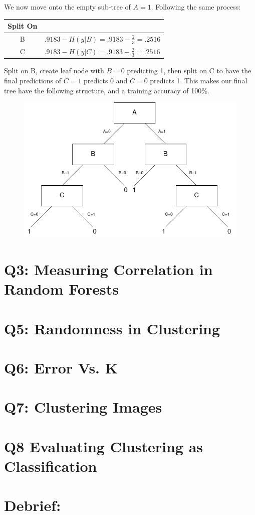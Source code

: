 \documentclass{article}
\begin{document}
        \qquad We now move onto the empty sub-tree of $A=1$. 
        Following the same process:
        \begin{center}
            \begin{tabular}{c | l}
                Split On & \\
                \hline
                B & $.9183 - H(y | B) = .9183 - \frac{2}{3} = .2516$\\
                C & $.9183 - H(y | C) = .9183 - \frac{2}{3} = .2516$\\
            \end{tabular}
        \end{center}
        \qquad Split on B, create leaf node with $B=0$ predicting 1, then split on C to have the final predictions of $C=1$ predicts 0 and $C=0$ predicts 1. 
        This makes our final tree have the following structure, and a training accuracy of 100\%. 
        \begin{figure}[h]
            \centering
            \includegraphics[width=.5\textwidth]{"Q2_2.png"}
        \end{figure}
        \clearpage


    \section*{Q3: Measuring Correlation in Random Forests}
    \section*{Q5: Randomness in Clustering}
    \section*{Q6: Error Vs. K}
    \section*{Q7: Clustering Images}
    \section*{Q8 Evaluating Clustering as Classification}
    \section*{Debrief:}
\end{document}
